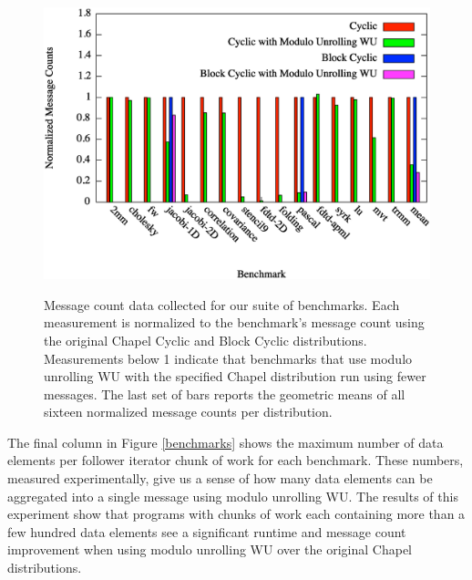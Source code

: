 \begin{figure}
\begin{center}
\includegraphics[width=\linewidth]{./Figures/message_counts}
\renewcommand{\baselinestretch}{1}
\small\normalsize
\begin{quote}
\caption[Benchmark suite evaluation: message count data]{Message count data collected for our suite of benchmarks. Each measurement is normalized to the benchmark's message count using the original Chapel Cyclic and Block Cyclic distributions. Measurements below 1 indicate that benchmarks that use modulo unrolling WU with the specified Chapel distribution run using fewer messages. The last set of bars reports the geometric means of all sixteen normalized message counts per distribution.\label{message_counts}}
\end{quote}
\end{center}
\end{figure}

The final column in Figure \ref{benchmarks} shows the maximum number of data elements per follower iterator chunk of work for each benchmark. These numbers, measured experimentally, give us a sense of how many data elements can be aggregated into a single message using modulo unrolling WU. The results of this experiment show that programs with chunks of work each containing more than a few hundred data elements see a significant runtime and message count improvement when using modulo unrolling WU over the original Chapel distributions. 

